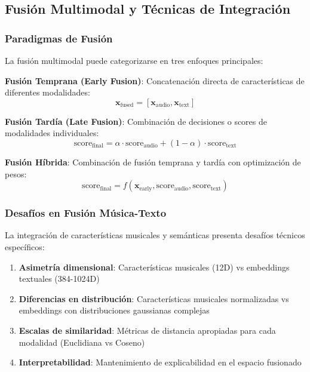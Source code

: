 \documentclass[12pt,a4paper]{article}
\begin{document}
\subsection{Fusión Multimodal y Técnicas de Integración}

\subsubsection{Paradigmas de Fusión}

La fusión multimodal puede categorizarse en tres enfoques principales:

\textbf{Fusión Temprana (Early Fusion)}: Concatenación directa de características de diferentes modalidades:
\[\mathbf{x}_{\text{fused}} = [\mathbf{x}_{\text{audio}}, \mathbf{x}_{\text{text}}]\]

\textbf{Fusión Tardía (Late Fusion)}: Combinación de decisiones o scores de modalidades individuales:
\[\text{score}_{\text{final}} = \alpha \cdot \text{score}_{\text{audio}} + (1-\alpha) \cdot \text{score}_{\text{text}}\]

\textbf{Fusión Híbrida}: Combinación de fusión temprana y tardía con optimización de pesos:
\[\text{score}_{\text{final}} = f(\mathbf{x}_{\text{early}}, \text{score}_{\text{audio}}, \text{score}_{\text{text}})\]

\subsubsection{Desafíos en Fusión Música-Texto}

La integración de características musicales y semánticas presenta desafíos técnicos específicos:

\begin{enumerate}
    \item \textbf{Asimetría dimensional}: Características musicales (12D) vs embeddings textuales (384-1024D)
    \item \textbf{Diferencias en distribución}: Características musicales normalizadas vs embeddings con distribuciones gaussianas complejas
    \item \textbf{Escalas de similaridad}: Métricas de distancia apropiadas para cada modalidad (Euclidiana vs Coseno)
    \item \textbf{Interpretabilidad}: Mantenimiento de explicabilidad en el espacio fusionado
\end{enumerate}

\end{document}
